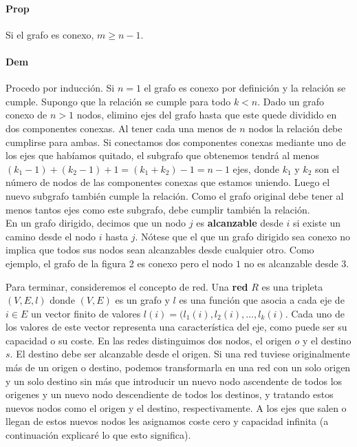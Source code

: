 \paragraph{Prop} Si el grafo es conexo, $m \geq n-1$.

\paragraph{Dem} Procedo por inducción.
Si $n = 1$ el grafo es conexo por definición y la relación se cumple.
Supongo que la relación se cumple para todo $k < n$.
Dado un grafo conexo de $n > 1$ nodos, elimino ejes del grafo hasta que este quede dividido en dos componentes conexas.
Al tener cada una menos de $n$ nodos la relación debe cumplirse para ambas.
Si conectamos dos componentes conexas mediante uno de los ejes que habíamos quitado, el subgrafo que obtenemos tendrá al menos $(k_1 - 1) + (k_2 - 1) + 1 = (k_1 + k_2) -1 = n - 1$ ejes, donde $k_1$ y $k_2$ son el número de nodos de las componentes conexas que estamos uniendo.
Luego el nuevo subgrafo también cumple la relación.
Como el grafo original debe tener al menos tantos ejes como este subgrafo, debe cumplir también la relación.\\

En un grafo dirigido, decimos que un nodo $j$ es \textbf{alcanzable} desde $i$ si existe un camino desde el nodo $i$ hasta $j$.
Nótese que el que un grafo dirigido sea conexo no implica que todos sus nodos sean alcanzables desde cualquier otro.
Como ejemplo, el grafo de la figura 2 es conexo pero el nodo $1$ no es alcanzable desde $3$.

Para terminar, consideremos el concepto de red.
Una \textbf{red} $R$ es una tripleta $(V,E,l)$ donde $(V,E)$ es un grafo y $l$ es una función que asocia a cada eje de $i \in E$ un vector finito de valores $l(i)=(l_1(i),l_2(i),\dots,l_k(i)$.
Cada uno de los valores de este vector representa una característica del eje, como puede ser su capacidad o su coste.
En las redes distinguimos dos nodos, el origen $o$ y el destino $s$.
El destino debe ser alcanzable desde el origen.
Si una red tuviese originalmente más de un origen o destino, podemos transformarla en una red con un solo origen y un solo destino sin más que introducir un nuevo nodo ascendente de todos los origenes y un nuevo nodo descendiente de todos los destinos, y tratando estos nuevos nodos como el origen y el destino, respectivamente.
A los ejes que salen o llegan de estos nuevos nodos les asignamos coste cero y capacidad infinita (a continuación explicaré lo que esto significa).\\

